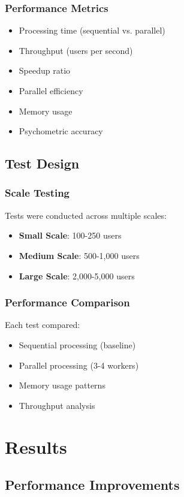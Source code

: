 \documentclass[11pt]{article}
\begin{document}
\subsubsection{Performance Metrics}
\begin{itemize}
\item Processing time (sequential vs. parallel)
\item Throughput (users per second)
\item Speedup ratio
\item Parallel efficiency
\item Memory usage
\item Psychometric accuracy
\end{itemize}

\subsection{Test Design}

\subsubsection{Scale Testing}
Tests were conducted across multiple scales:
\begin{itemize}
\item \textbf{Small Scale}: 100-250 users
\item \textbf{Medium Scale}: 500-1,000 users  
\item \textbf{Large Scale}: 2,000-5,000 users
\end{itemize}

\subsubsection{Performance Comparison}
Each test compared:
\begin{itemize}
\item Sequential processing (baseline)
\item Parallel processing (3-4 workers)
\item Memory usage patterns
\item Throughput analysis
\end{itemize}

\section{Results}

\subsection{Performance Improvements}
\end{document}

